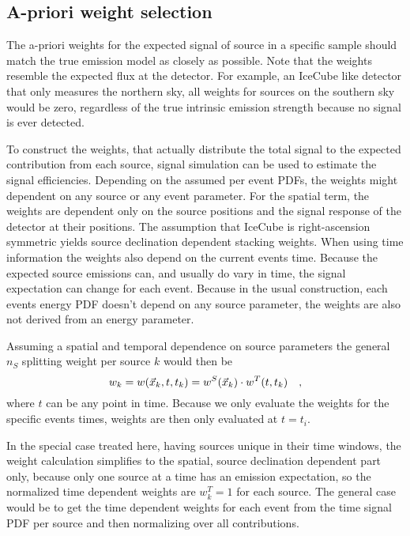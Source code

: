 \subsection{A-priori weight selection}
The a-priori weights for the expected signal of source in a specific sample should match the true emission model as closely as possible.
Note that the weights resemble the expected flux at the detector.
For example, an IceCube like detector that only measures the northern sky, all weights for sources on the southern sky would be zero, regardless of the true intrinsic emission strength because no signal is ever detected.

To construct the weights, that actually distribute the total signal to the expected contribution from each source, signal simulation can be used to estimate the signal efficiencies.
Depending on the assumed per event PDFs, the weights might dependent on any source or any event parameter.
For the spatial term, the weights are dependent only on the source positions and the signal response of the detector at their positions.
The assumption that IceCube is right-ascension symmetric yields source declination dependent stacking weights.
When using time information the weights also depend on the current events time.
Because the expected source emissions can, and usually do vary in time, the signal expectation can change for each event.
Because in the usual construction, each events energy PDF doesn't depend on any source parameter, the weights are also not derived from an energy parameter.

Assuming a spatial and temporal dependence on source parameters the general $n_S$ splitting weight per source $k$ would then be
\begin{equation}
  w_k = w(\vec{x}_k, t, t_k) = w^S(\vec{x}_k)\cdot w^T(t, t_k)
  \quad\text{,}
\end{equation}
where $t$ can be any point in time.
Because we only evaluate the weights for the specific events times, weights are then only evaluated at $t=t_i$.

In the special case treated here, having sources unique in their time windows, the weight calculation simplifies to the spatial, source declination dependent part only, because only one source at a time has an emission expectation, so the normalized time dependent weights are $w_k^T = 1$ for each source.
The general case would be to get the time dependent weights for each event from the time signal PDF per source and then normalizing over all contributions.


